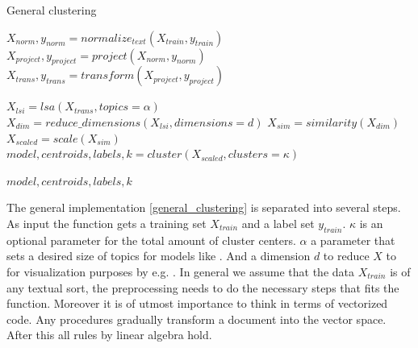   \begin{algorithm}[H]
  \begin{algorithmic}[1]
    \caption{General clustering}\label{general_clustering}
      \State $X_{norm},y_{norm} = normalize_{text}(X_{train},y_{train})$
      \State $X_{project},y_{project} = project(X_{norm},y_{norm})$
      \State $X_{trans},y_{trans} = transform(X_{project},y_{project})$

      \State $X_{lsi} = lsa(X_{trans}, topics=\alpha)$
      \State $X_{dim} = reduce\_dimensions(X_{lsi}, dimensions=d)$
      \State $X_{sim} = similarity(X_{dim})$
      \State $X_{scaled} = scale(X_{sim})$
      \State $model,centroids,labels,k = cluster(X_{scaled}, clusters=\kappa)$

      \State \Return $model,centroids,labels,k$
    \EndFunction
  \end{algorithmic}
  \end{algorithm}

The general implementation \ref{general_clustering} is separated into several steps. As input the function gets a training set $X_{train}$ and a label set $y_{train}$. $\kappa$ is an optional parameter for the total amount of cluster centers. $\alpha$ a parameter that sets a desired size of topics for models like \lsa{}. And a dimension $d$ to reduce $X$ to for visualization purposes by e.g. \pca{}. In general we assume that the data $X_{train}$ is of any textual sort, the preprocessing needs to do the necessary steps that fits the function. Moreover it is of utmost importance to think in terms of vectorized code. Any procedures gradually transform a document into the vector space. After this all rules by linear algebra hold.

